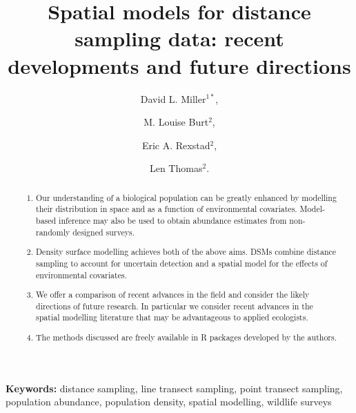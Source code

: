 \documentclass[a4paper,12pt]{article}
\title{Spatial models for distance sampling data: recent developments and future directions}
\author{
David L. Miller$^{1*}$, \and
M. Louise Burt$^{2}$, \and
Eric A. Rexstad$^{2}$, \and 
Len Thomas$^{2}$.}
\begin{document}
\maketitle

\begin{abstract}
  \noindent 
  

\begin{enumerate}
	\item Our understanding of a biological population can be greatly enhanced by modelling their distribution in space and as a function of environmental covariates. Model-based inference may also be used to obtain abundance estimates from non-randomly designed surveys. 
	\item Density surface modelling achieves both of the above aims. DSMs combine distance sampling to account for uncertain detection and a spatial model for the effects of environmental covariates.
	\item We offer a comparison of recent advances in the field and consider the likely directions of future research. In particular we consider recent advances in the spatial modelling literature that may be advantageous to applied ecologists.
	\item The methods discussed are freely available in \textsf{R} packages developed by the authors.
\end{enumerate}
 

\end{abstract}

\noindent \textbf{Keywords:} distance sampling, line transect sampling, point transect sampling, population abundance, population density, spatial modelling, wildlife surveys
\end{document}
